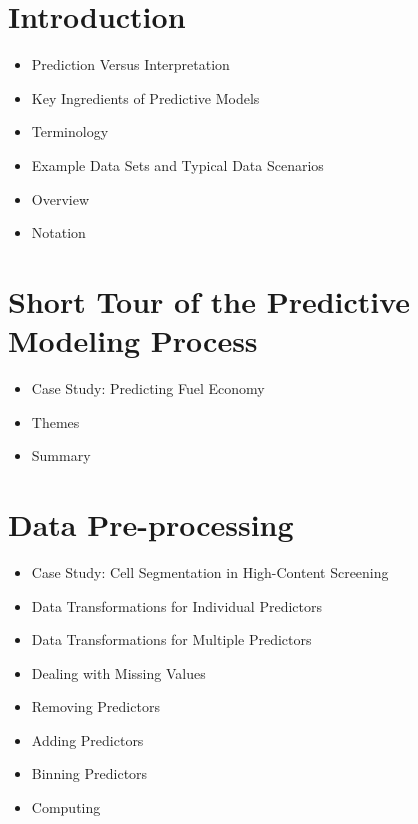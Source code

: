 \section{Introduction}  
\begin{itemize}
\item Prediction Versus Interpretation 
\item Key Ingredients of Predictive Models  
\item Terminology 
\item Example Data Sets and Typical Data Scenarios 
\item Overview  
\item Notation 
\end{itemize} 
\section{Short Tour of the Predictive Modeling Process}
\begin{itemize}
\item Case Study: Predicting Fuel Economy  
\item Themes  
\item Summary  
\end{itemize}
\section{Data Pre-processing}  
\begin{itemize}
\item Case Study: Cell Segmentation in High-Content Screening 
\item Data Transformations for Individual Predictors  
\item Data Transformations for Multiple Predictors  
\item Dealing with Missing Values  
\item Removing Predictors 
\item Adding Predictors  
\item Binning Predictors  
\item Computing 
\end{itemize} 

